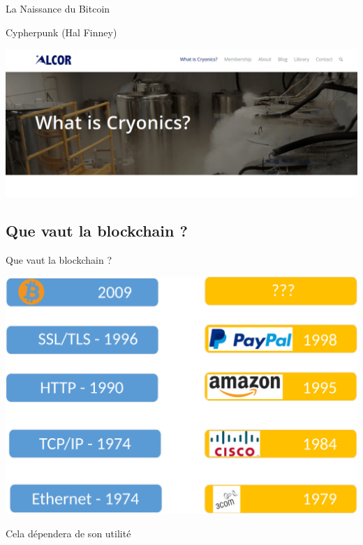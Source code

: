 \documentclass[presentation]{beamer}
\begin{document}
\begin{frame}[label={sec:org32b58f8}]{La Naissance du Bitcoin}
\begin{block}{Cypherpunk (Hal Finney)}
\begin{center}
\includegraphics[width=\linewidth]{Pictures/cryonics_hal_finney.png}
\end{center}
\end{block}
\end{frame}

\subsection{Que vaut la blockchain ?}
\label{sec:org29a2cbc}
\begin{frame}[label={sec:org8015952}]{Que vaut la blockchain ?}
\begin{center}
\includegraphics[width=.8\linewidth]{Pictures/layers_btc.png}
\end{center}
\begin{block}{Cela dépendera de son utilité}
\end{block}
\end{frame}
\end{document}
